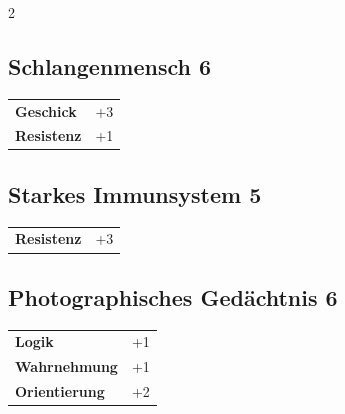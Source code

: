\begin{multicols}{2}
\begin{tcolorbox}
    \subsection*{Schlangenmensch \hfill \small{6 }}
    \tcblower




\begin{tabular}{@{}ll@{}}
    \textbf{Geschick} & +3\\
    \textbf{Resistenz} & +1\\
\end{tabular}


\end{tcolorbox}

\begin{tcolorbox}
    \subsection*{Starkes Immunsystem \hfill \small{5 }}
    \tcblower




\begin{tabular}{@{}ll@{}}
    \textbf{Resistenz} & +3\\
\end{tabular}


\end{tcolorbox}

\begin{tcolorbox}
    \subsection*{Photographisches Gedächtnis \hfill \small{6 }}
    \tcblower




\begin{tabular}{@{}ll@{}}
    \textbf{Logik} & +1\\
    \textbf{Wahrnehmung} & +1\\
    \textbf{Orientierung} & +2\\
\end{tabular}


\end{tcolorbox}
\end{multicols}
